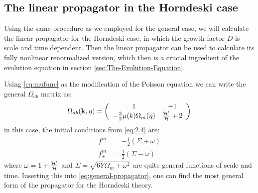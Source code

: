 \subsection{The linear propagator in the Horndeski case}

Using the same procedure as we employed for the general case, we will calculate the linear propagator
for the Horndeski case, in which the growth factor $D$ is scale
and time dependent. Then the linear propagator can be used to calculate
its fully nonlinear renormalized version, which then is a crucial
ingredient of the evolution equation in section \ref{sec:The-Evolution-Equation}.

Using \cref{eq:mufunc} as the modification of the Poisson equation
we can write the general $\Omega_{ab}$ matrix as:
\begin{equation}
\Omega_{ab}(\mathbf{k},\eta)=\left(\begin{array}{cc}
1 & -1\\
-\frac{3}{2} \mu(k)\Omega_{m}(\eta) & \frac{\mathcal{H}'}{\mathcal{H}}+2
\end{array}\right)
\end{equation}
in this case, the initial conditions from \cref{eq:2.4} are: 
\begin{equation}
\begin{aligned}f_{-}^{in} & =-\frac{1}{2}(\Sigma+\omega)\\
f_{+}^{in} & =\frac{1}{2}(\Sigma-\omega)
\end{aligned}
\end{equation}
where $\omega=1+\frac{\mathcal{H}'}{\mathcal{H}}$
and $\Sigma=\sqrt{6Y\Omega_{m}+\omega^{2}}$ are quite general functions
of scale and time. Inserting this into \cref{eq:general-propagator},
one can find the most general form of the propagator for the Horndeski
theory. 

